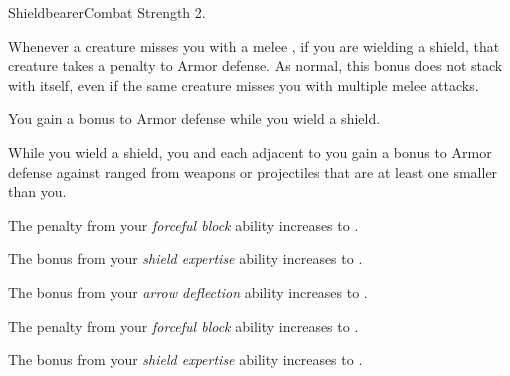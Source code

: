     \begin{feat}{Shieldbearer}{Combat}
        \featpre Strength 2.

         Whenever a creature misses you with a melee , if you are wielding a shield, that creature  takes a  penalty to Armor defense.
        As normal, this bonus does not stack with itself, even if the same creature misses you with multiple melee attacks.

         You gain a  bonus to Armor defense while you wield a shield.

         While you wield a shield, you and each  adjacent to you gain a  bonus to Armor defense against ranged  from weapons or projectiles that are at least one  smaller than you.

         The penalty from your \textit{forceful block} ability increases to .

         The bonus from your \textit{shield expertise} ability increases to .

         The bonus from your \textit{arrow deflection} ability increases to .

         The penalty from your \textit{forceful block} ability increases to .

         The bonus from your \textit{shield expertise} ability increases to .
    \end{feat}

